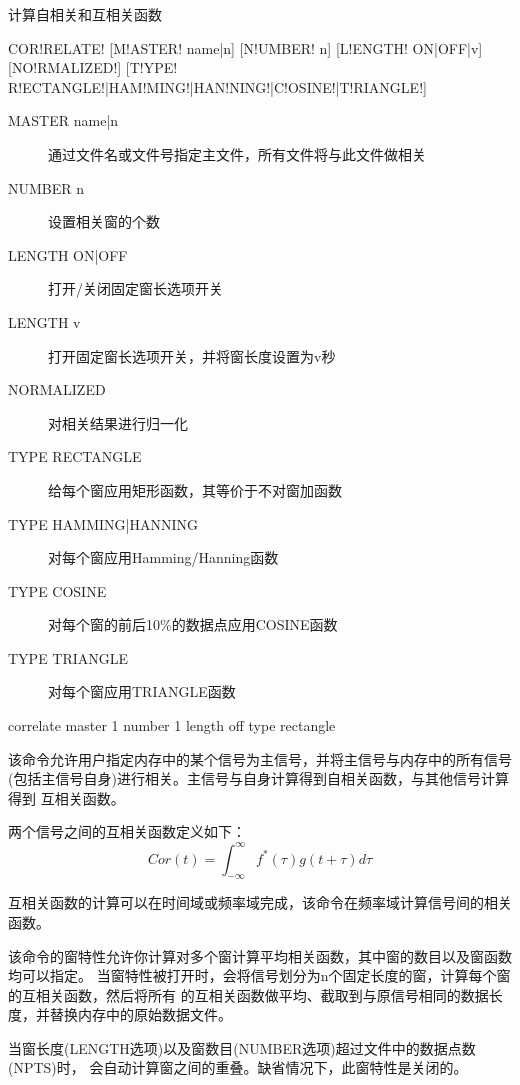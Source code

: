 \label{cmd:correlate}

计算自相关和互相关函数

\begin{SACSTX}
COR!RELATE! [M!ASTER! name|n] [N!UMBER! n] [L!ENGTH! ON|OFF|v] [NO!RMALIZED!]
    [T!YPE! R!ECTANGLE!|HAM!MING!|HAN!NING!|C!OSINE!|T!RIANGLE!]
\end{SACSTX}

\begin{description}
\item [MASTER name|n] 通过文件名或文件号指定主文件，所有文件将与此文件做相关
\item [NUMBER n] 设置相关窗的个数
\item [LENGTH ON|OFF] 打开/关闭固定窗长选项开关
\item [LENGTH v] 打开固定窗长选项开关，并将窗长度设置为v秒
\item [NORMALIZED] 对相关结果进行归一化
\item [TYPE RECTANGLE] 给每个窗应用矩形函数，其等价于不对窗加函数
\item [TYPE HAMMING|HANNING] 对每个窗应用Hamming/Hanning函数
\item [TYPE COSINE] 对每个窗的前后10\%的数据点应用COSINE函数
\item [TYPE TRIANGLE] 对每个窗应用TRIANGLE函数
\end{description}

\begin{SACDFT}
correlate master 1 number 1 length off type rectangle
\end{SACDFT}

该命令允许用户指定内存中的某个信号为主信号，并将主信号与内存中的所有信号
(包括主信号自身)进行相关。主信号与自身计算得到自相关函数，与其他信号计算得到
互相关函数。

两个信号之间的互相关函数定义如下：
\[ Cor(t) = \int_{-\infty} ^\infty f^*(\tau)g(t+\tau)d\tau \]

互相关函数的计算可以在时间域或频率域完成，该命令在频率域计算信号间的相关函数。

该命令的窗特性允许你计算对多个窗计算平均相关函数，其中窗的数目以及窗函数均可以指定。
当窗特性被打开时，会将信号划分为n个固定长度的窗，计算每个窗的互相关函数，然后将所有
的互相关函数做平均、截取到与原信号相同的数据长度，并替换内存中的原始数据文件。

当窗长度(LENGTH选项)以及窗数目(NUMBER选项)超过文件中的数据点数(NPTS)时，
会自动计算窗之间的重叠。缺省情况下，此窗特性是关闭的。

